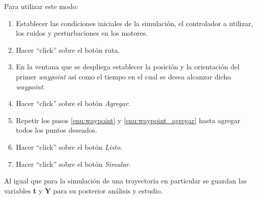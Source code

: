 \documentclass[main]{subfiles}
\begin{document}
Para utilizar este modo:
\begin{enumerate}
\item Establecer las condiciones iniciales de la simulaci\'on, el controlador a utilizar, los ruidos y perturbaciones en los motores.
\item Hacer ``click'' sobre el bot\'on ruta. 
\item\label{enu:waypoint} En la ventana que se despliega establecer la posici\'on y la orientaci\'on del primer \emph{waypoint} as\'i como el tiempo en el cual se desea alcanzar dicho \emph{waypoint}.
\item\label{enu:waypoint_agregar} Hacer ``click'' sobre el bot\'on \emph{Agregar}.
\item Repetir los pasos \ref{enu:waypoint} y \ref{enu:waypoint_agregar} hasta agregar todos los puntos deseados.
\item Hacer ``click'' sobre el bot\'on \emph{Listo}.
\item Hacer ``click'' sobre el bot\'on \emph{Simular}.
\end{enumerate}

Al igual que para la simulaci\'on de una trayectoria en particular se guardan las variables \textbf{t} y \textbf{Y} para su posterior an\'alisis y estudio.
\end{document}
